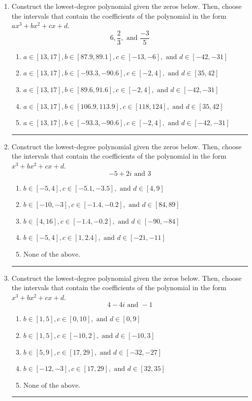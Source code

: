 \documentclass[14pt]{extbook}
\newcommand{\litem}[1]{\item#1\hspace*{-1cm}\rule{\textwidth}{0.4pt}}
\begin{document}
\begin{enumerate}
\litem{
Construct the lowest-degree polynomial given the zeros below. Then, choose the intervals that contain the coefficients of the polynomial in the form $ax^3+bx^2+cx+d$.\[ 6, \frac{2}{3}, \text{ and } \frac{-3}{5} \]\begin{enumerate}[label=\Alph*.]
\item \( a \in [13, 17], b \in [87.9, 89.1], c \in [-13, -6], \text{ and } d \in [-42, -31] \)
\item \( a \in [13, 17], b \in [-93.3, -90.6], c \in [-2, 4], \text{ and } d \in [35, 42] \)
\item \( a \in [13, 17], b \in [89.6, 91.6], c \in [-2, 4], \text{ and } d \in [-42, -31] \)
\item \( a \in [13, 17], b \in [106.9, 113.9], c \in [118, 124], \text{ and } d \in [35, 42] \)
\item \( a \in [13, 17], b \in [-93.3, -90.6], c \in [-2, 4], \text{ and } d \in [-42, -31] \)

\end{enumerate} }
\litem{
Construct the lowest-degree polynomial given the zeros below. Then, choose the intervals that contain the coefficients of the polynomial in the form $x^3+bx^2+cx+d$.\[ -5 + 2 i \text{ and } 3 \]\begin{enumerate}[label=\Alph*.]
\item \( b \in [-5, 4], c \in [-5.1, -3.5], \text{ and } d \in [4, 9] \)
\item \( b \in [-10, -3], c \in [-1.4, -0.2], \text{ and } d \in [84, 89] \)
\item \( b \in [4, 16], c \in [-1.4, -0.2], \text{ and } d \in [-90, -84] \)
\item \( b \in [-5, 4], c \in [1, 2.4], \text{ and } d \in [-21, -11] \)
\item \( \text{None of the above.} \)

\end{enumerate} }
\litem{
Construct the lowest-degree polynomial given the zeros below. Then, choose the intervals that contain the coefficients of the polynomial in the form $x^3+bx^2+cx+d$.\[ 4 - 4 i \text{ and } -1 \]\begin{enumerate}[label=\Alph*.]
\item \( b \in [1, 5], c \in [0, 10], \text{ and } d \in [0, 9] \)
\item \( b \in [1, 5], c \in [-10, 2], \text{ and } d \in [-10, 3] \)
\item \( b \in [5, 9], c \in [17, 29], \text{ and } d \in [-32, -27] \)
\item \( b \in [-12, -3], c \in [17, 29], \text{ and } d \in [32, 35] \)
\item \( \text{None of the above.} \)


\end{enumerate}}
\end{enumerate}
\end{document}
